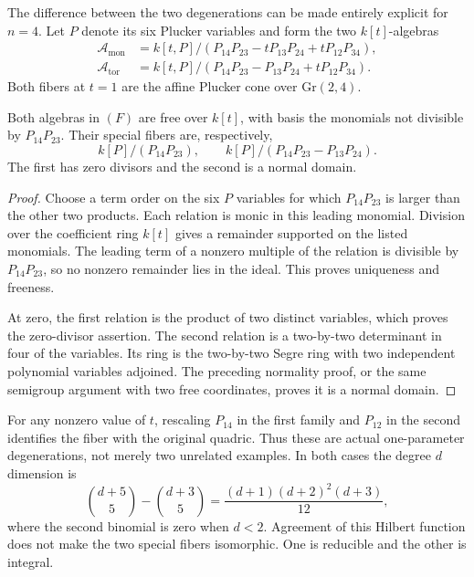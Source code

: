 The difference between
the two degenerations
can be made entirely
explicit for \(n=4\).
Let \(P\) denote its
six Plucker variables
and form the two
\(k[t]\)-algebras
\[
 \begin{split}
 \mathcal A_{\mathrm{mon}}
 &=k[t,P]/
   (P_{14}P_{23}-tP_{13}P_{24}+tP_{12}P_{34}),\\
 \mathcal A_{\mathrm{tor}}
 &=k[t,P]/
   (P_{14}P_{23}-P_{13}P_{24}+tP_{12}P_{34}).
 \end{split}
 \tag{F}
\]
Both fibers at \(t=1\)
are the affine
Plucker cone over
\(\mathrm{Gr}(2,4)\).

\begin{proposition}
Both algebras in \((F)\)
are free over \(k[t]\),
with basis the
monomials not divisible
by \(P_{14}P_{23}\).
Their special fibers
are, respectively,
\[
 k[P]/(P_{14}P_{23}),\qquad
 k[P]/(P_{14}P_{23}-P_{13}P_{24}).
 \]
The first has zero
divisors and the
second is a normal
domain.
\end{proposition}
\begin{proof}
Choose a term order
on the six \(P\)
variables for which
\(P_{14}P_{23}\)
is larger than
the other two
products.  Each
relation is monic
in this leading
monomial.  Division
over the coefficient
ring \(k[t]\)
gives a remainder
supported on the
listed monomials.
The leading term
of a nonzero
multiple of the
relation is
divisible by
\(P_{14}P_{23}\),
so no nonzero
remainder lies
in the ideal.
This proves
uniqueness and
freeness.

At zero, the
first relation
is the product
of two distinct
variables, which
proves the
zero-divisor
assertion.
The second
relation is a
two-by-two
determinant
in four of
the variables.
Its ring is
the two-by-two
Segre ring
with two
independent
polynomial
variables adjoined.
The preceding
normality proof,
or the same
semigroup
argument with
two free
coordinates,
proves it is
a normal
domain.
\end{proof}

For any nonzero
value of \(t\),
rescaling \(P_{14}\)
in the first
family and
\(P_{12}\) in
the second
identifies the
fiber with the
original quadric.
Thus these are
actual one-parameter
degenerations,
not merely two
unrelated examples.
In both cases
the degree \(d\)
dimension is
\[
 \binom{d+5}{5}-\binom{d+3}{5}
   =\frac{(d+1)(d+2)^2(d+3)}{12},
\]
where the second
binomial is zero
when \(d<2\).
Agreement of this
Hilbert function
does not make
the two special
fibers isomorphic.
One is reducible
and the other
is integral.

